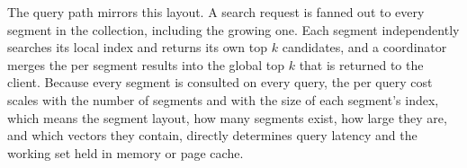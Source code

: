 The query path mirrors this layout. A search request is fanned out to
every segment in the collection, including the growing one. Each
segment independently searches its local index and returns its own
top $k$ candidates, and a coordinator merges the per segment results
into the global top $k$ that is returned to the client. Because every
segment is consulted on every query, the per query cost scales with
the number of segments and with the size of each segment's index,
which means the segment layout, how many segments exist, how large
they are, and which vectors they contain, directly determines query
latency and the working set held in memory or page cache.
